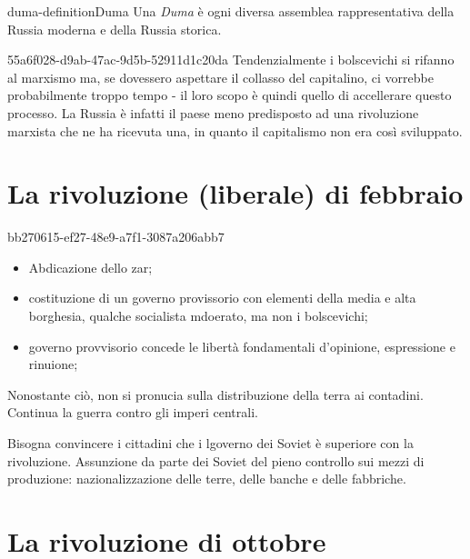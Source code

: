 \documentclass[preview]{standalone}
\begin{document}
\begin{snippetdefinition}{duma-definition}{Duma}
    Una \textit{Duma} è ogni diversa assemblea rappresentativa della Russia moderna e della Russia storica.
\end{snippetdefinition}

\begin{snippet}{55a6f028-d9ab-47ac-9d5b-52911d1c20da}
    Tendenzialmente i bolscevichi si rifanno al marxismo ma,
    se dovessero aspettare il collasso del capitalino, ci vorrebbe probabilmente troppo
    tempo - il loro scopo è quindi quello di accellerare questo processo.
    La Russia è infatti il paese meno predisposto ad una rivoluzione marxista che ne ha ricevuta una,
    in quanto il capitalismo non era così sviluppato.
\end{snippet}

\section{La rivoluzione (liberale) di febbraio}

\begin{snippet}{bb270615-ef27-48e9-a7f1-3087a206abb7}
    \begin{itemize}
        \item Abdicazione dello zar;
        \item costituzione di un governo provissorio con elementi della media e alta borghesia, qualche socialista mdoerato, ma non i bolscevichi;
        \item governo provvisorio concede le libertà fondamentali d'opinione, espressione e rinuione;
    \end{itemize}
    
    Nonostante ciò, non si pronucia sulla distribuzione della terra ai contadini.
    Continua la guerra contro gli imperi centrali.
    
    
    Bisogna convincere i cittadini che i lgoverno dei Soviet è superiore
    con la rivoluzione.
    Assunzione da parte dei Soviet del pieno controllo sui mezzi di produzione: nazionalizzazione delle terre, delle banche e delle fabbriche.
\end{snippet}

\section{La rivoluzione di ottobre}
\end{document}
